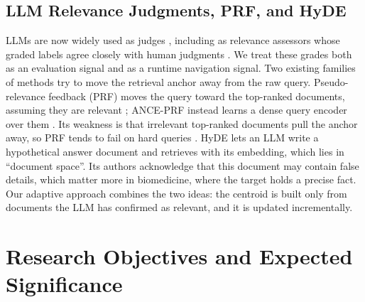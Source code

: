 \documentclass[11pt,a4paper]{article}
\begin{document}
\subsection{LLM Relevance Judgments, PRF, and HyDE}
LLMs are now widely used as judges \citep{zheng2023judging}, including as relevance assessors whose graded labels agree closely with human judgments \citep{thomas2024llmjudge}. We treat these grades both as an evaluation signal and as a runtime navigation signal. Two existing families of methods try to move the retrieval anchor away from the raw query. Pseudo-relevance feedback (PRF) moves the query toward the top-ranked documents, assuming they are relevant \citep{rocchio1971relevance,robertson2009bm25}; ANCE-PRF instead learns a dense query encoder over them \citep{yu2021anceprf}. Its weakness is that irrelevant top-ranked documents pull the anchor away, so PRF tends to fail on hard queries \citep{robertson2009bm25}. HyDE \citep{gao2023hyde} lets an LLM write a hypothetical answer document and retrieves with its embedding, which lies in ``document space''. Its authors acknowledge that this document may contain false details, which matter more in biomedicine, where the target holds a precise fact. Our adaptive approach combines the two ideas: the centroid is built only from documents the LLM has confirmed as relevant, and it is updated incrementally.

\section{Research Objectives and Expected Significance}
\end{document}
